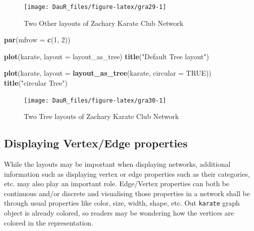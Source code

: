 \documentclass[
]{book}
\newenvironment{Shaded}{\begin{snugshade}}{\end{snugshade}}
\newcommand{\AttributeTok}[1]{\textcolor[rgb]{0.13,0.29,0.53}{#1}}
\newcommand{\ConstantTok}[1]{\textcolor[rgb]{0.56,0.35,0.01}{#1}}
\newcommand{\DecValTok}[1]{\textcolor[rgb]{0.00,0.00,0.81}{#1}}
\newcommand{\FunctionTok}[1]{\textcolor[rgb]{0.13,0.29,0.53}{\textbf{#1}}}
\newcommand{\NormalTok}[1]{#1}
\newcommand{\StringTok}[1]{\textcolor[rgb]{0.31,0.60,0.02}{#1}}
\begin{document}
\begin{figure}

{\centering \texttt{[image: DauR\_files/figure-latex/gra29-1]} 

}

\caption{Two Other layouts of Zachary Karate Club Network}\label{fig:gra29}
\end{figure}

\begin{Shaded}
\begin{Highlighting}[]
\FunctionTok{par}\NormalTok{(}\AttributeTok{mfrow =} \FunctionTok{c}\NormalTok{(}\DecValTok{1}\NormalTok{, }\DecValTok{2}\NormalTok{))}

\FunctionTok{plot}\NormalTok{(karate, }\AttributeTok{layout =}\NormalTok{ layout\_as\_tree)}
\FunctionTok{title}\NormalTok{(}\StringTok{"Default Tree layout"}\NormalTok{)}

\FunctionTok{plot}\NormalTok{(karate, }\AttributeTok{layout =} \FunctionTok{layout\_as\_tree}\NormalTok{(karate, }\AttributeTok{circular =} \ConstantTok{TRUE}\NormalTok{))}
\FunctionTok{title}\NormalTok{(}\StringTok{"circular Tree"}\NormalTok{)}
\end{Highlighting}
\end{Shaded}

\begin{figure}

{\centering \texttt{[image: DauR\_files/figure-latex/gra30-1]} 

}

\caption{Two Tree layouts of Zachary Karate Club Network}\label{fig:gra30}
\end{figure}

\hypertarget{displaying-vertexedge-properties}{%
\subsection{Displaying Vertex/Edge properties}\label{displaying-vertexedge-properties}}

While the layouts may be important when displaying networks, additional information such as displaying vertex or edge properties such as their categories, etc. may also play an important role. Edge/Vertex properties can both be continuous and/or discrete and visualising those properties in a network shall be through usual properties like color, size, width, shape, etc. Out \texttt{karate} graph object is already colored, so readers may be wondering how the vertices are colored in the representation.
\end{document}
